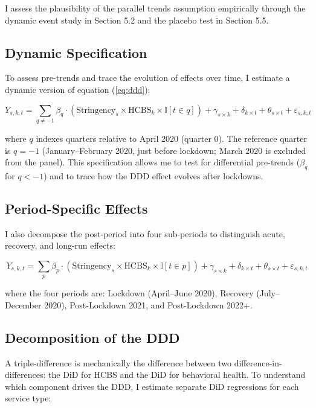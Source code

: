\documentclass[12pt]{article}
\newcommand{\ind}{\mathbb{I}}
\begin{document}
I assess the plausibility of the parallel trends assumption empirically through the dynamic event study in Section 5.2 and the placebo test in Section 5.5.

\subsection{Dynamic Specification}

To assess pre-trends and trace the evolution of effects over time, I estimate a dynamic version of equation (\ref{eq:ddd}):

\begin{equation}
Y_{s,k,t} = \sum_{q \neq -1} \beta_q \cdot (\text{Stringency}_s \times \text{HCBS}_k \times \ind[t \in q]) + \gamma_{s \times k} + \delta_{k \times t} + \theta_{s \times t} + \varepsilon_{s,k,t}
\label{eq:dynamic}
\end{equation}

\noindent where $q$ indexes quarters relative to April 2020 (quarter 0). The reference quarter is $q = -1$ (January--February 2020, just before lockdown; March 2020 is excluded from the panel). This specification allows me to test for differential pre-trends ($\beta_q$ for $q < -1$) and to trace how the DDD effect evolves after lockdowns.

\subsection{Period-Specific Effects}

I also decompose the post-period into four sub-periods to distinguish acute, recovery, and long-run effects:

\begin{equation}
Y_{s,k,t} = \sum_{p} \beta_p \cdot (\text{Stringency}_s \times \text{HCBS}_k \times \ind[t \in p]) + \gamma_{s \times k} + \delta_{k \times t} + \theta_{s \times t} + \varepsilon_{s,k,t}
\label{eq:periods}
\end{equation}

\noindent where the four periods are: Lockdown (April--June 2020), Recovery (July--December 2020), Post-Lockdown 2021, and Post-Lockdown 2022+.

\subsection{Decomposition of the DDD}

A triple-difference is mechanically the difference between two difference-in-differences: the DiD for HCBS and the DiD for behavioral health. To understand which component drives the DDD, I estimate separate DiD regressions for each service type:
\end{document}
